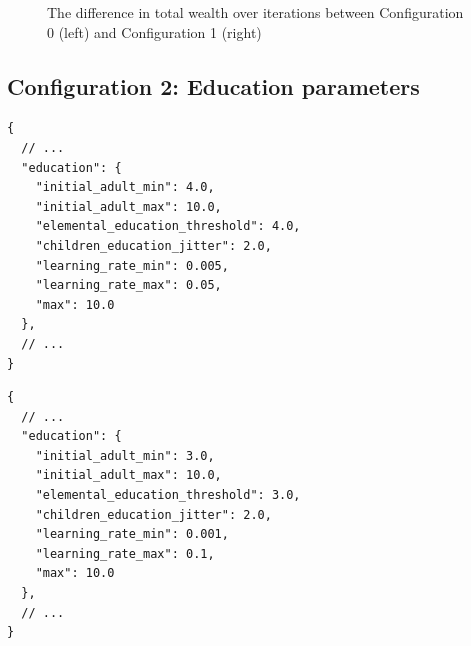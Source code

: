 \documentclass[english]{projectreport}
\begin{document}
\begin{figure}[H]
\begin{center}
%
\label{fig:c1-total_wealth}
\end{center}
\caption{The difference in total wealth over iterations between Configuration 0 (left) and Configuration 1 (right)}
\end{figure}


\subsection{Configuration 2: Education parameters}

\begin{minipage}{0.48\textwidth}
\begin{verbatim}
{
  // ...
  "education": {
    "initial_adult_min": 4.0,
    "initial_adult_max": 10.0,
    "elemental_education_threshold": 4.0,
    "children_education_jitter": 2.0,
    "learning_rate_min": 0.005,
    "learning_rate_max": 0.05,
    "max": 10.0
  },
  // ...
}
\end{verbatim}
\end{minipage}
\hfill
\begin{minipage}{0.48\textwidth}
\begin{verbatim}
{
  // ...
  "education": {
    "initial_adult_min": 3.0,
    "initial_adult_max": 10.0,
    "elemental_education_threshold": 3.0,
    "children_education_jitter": 2.0,
    "learning_rate_min": 0.001,
    "learning_rate_max": 0.1,
    "max": 10.0
  },
  // ...
}
\end{verbatim}
\end{minipage}
\end{document}
